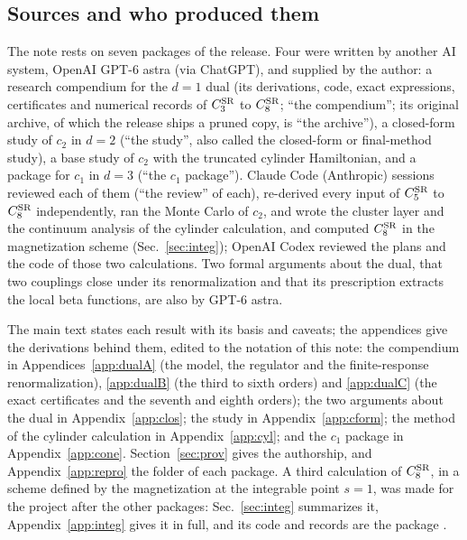 \documentclass[11pt,a4paper]{article}
\numberwithin{equation}{section}
\newcommand{\CSR}{C^{\rm SR}}
\newcommand{\file}[1]{\path{#1}}
\begin{document}
\subsection{Sources and who produced them}\label{sec:sources}
The note rests on seven packages of the release. Four were written by another AI system, OpenAI GPT-6 astra (via
ChatGPT), and supplied by the author: a research compendium for the $d=1$ dual (its derivations, code, exact
expressions, certificates and numerical records of $\CSR_3$ to $\CSR_8$; ``the compendium''; its original
archive, of which the release ships a pruned copy, is ``the archive''), a closed-form study of $c_2$ in $d=2$ (``the
study'', also called the closed-form or final-method study), a base study of $c_2$ with the truncated cylinder Hamiltonian, and a package for $c_1$
in $d=3$ (``the $c_1$ package''). Claude Code (Anthropic) sessions reviewed each of them (``the review'' of each),
re-derived every input of $\CSR_5$ to $\CSR_8$ independently, ran the Monte Carlo of $c_2$, and wrote the cluster
layer and the continuum analysis of the cylinder calculation, and computed $\CSR_8$ in the magnetization scheme
(Sec.~\ref{sec:integ}); OpenAI Codex reviewed the plans and the code of those two calculations. Two formal arguments about the dual, that two couplings close under its renormalization and that its
prescription extracts the local beta functions, are also by GPT-6 astra.

The main text states each result with its basis and caveats; the appendices give the derivations behind them, edited
to the notation of this note: the compendium in Appendices~\ref{app:dualA} (the model, the regulator and the
finite-response renormalization), \ref{app:dualB} (the third to sixth orders) and \ref{app:dualC} (the exact
certificates and the seventh and eighth orders); the two arguments about the dual in Appendix~\ref{app:clos}; the
study in Appendix~\ref{app:cform}; the method of the cylinder calculation in Appendix~\ref{app:cyl}; and the $c_1$
package in Appendix~\ref{app:cone}. Section~\ref{sec:prov} gives the authorship, and Appendix~\ref{app:repro} the
folder of each package. A third calculation of $\CSR_8$, in a scheme defined by the magnetization at the integrable
point $s=1$, was made for the project after the other packages: Sec.~\ref{sec:integ} summarizes it,
Appendix~\ref{app:integ} gives it in full, and its code and records are the package \file{integ_d1}.
\end{document}
